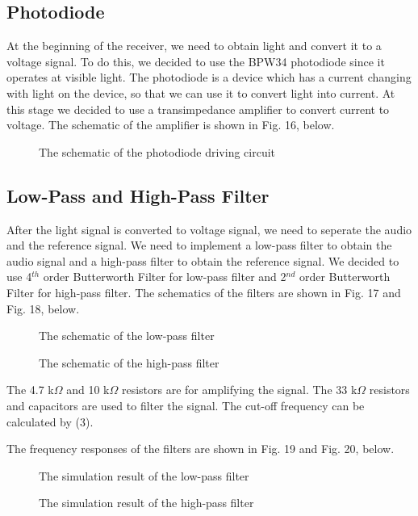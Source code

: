 \documentclass[conference]{IEEEtran}
\begin{document}
\subsection{Photodiode}
At the beginning of the receiver, we need to obtain light and convert it to a voltage signal. To do this, we decided to use the BPW34 photodiode \cite{BPW34} 
since it operates at visible light. The photodiode is a device which has a current changing with light on the device, so that we can use it 
to convert light into current. At this stage we decided to use a transimpedance amplifier to convert current to voltage. The schematic of the amplifier 
is shown in Fig. 16, below.
\begin{figure}[H]
  \centerline{}
  \caption{The schematic of the photodiode driving circuit}
\end{figure} 


\subsection{Low-Pass and High-Pass Filter}
After the light signal is converted to voltage signal, we need to seperate the audio and the reference signal. We need to implement 
a low-pass filter to obtain the audio signal and a high-pass filter to obtain the reference signal. We decided to use 4\(^{th}\) order Butterworth 
Filter \cite{butterworth} for low-pass filter and 2\(^{nd}\) order Butterworth Filter for high-pass filter. The schematics of the filters are shown in Fig. 17 and Fig. 18, below. 
\begin{figure}[H]
   \centerline{}
    \caption{The schematic of the low-pass filter}
\end{figure}
\begin{figure}[H]
   \centerline{}
    \caption{The schematic of the high-pass filter}
\end{figure}


The 4.7 k\(\Omega\) and 10 k\(\Omega\) resistors are for amplifying the signal. The 33 k\(\Omega\) resistors and capacitors are used to filter the signal. 
The cut-off frequency can be calculated by (3).

The frequency responses of the filters are shown in Fig. 19 and Fig. 20, below. 
\begin{figure}[H]
   \centerline{}
    \caption{The simulation result of the low-pass filter}
\end{figure}
\begin{figure}[H]
   \centerline{}
    \caption{The simulation result of the high-pass filter}
\end{figure}
\end{document}
